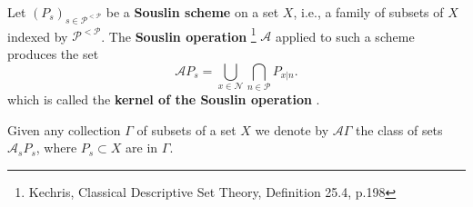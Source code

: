 \begin{definition}
Let $(P_s)_{s\in\mathcal{P}^{<\mathcal{P}}}$ be a \textbf{Souslin scheme}
on a set $X$, i.e., a family of subsets of $X$ indexed by
$\mathcal{P}^{<\mathcal{P}}$. The \textbf{Souslin operation}
\footnote{Kechris, Classical Descriptive Set Theory, Definition 25.4, p.198}
$\mathcal{A}$ applied to such a scheme produces the set
\[
  \mathcal{A} P_s 
    = \bigcup_{x\in\mathcal{N}} \bigcap_{n\in\mathcal{P}} P_{x|n}.
\]
which is called the \textbf{kernel of the Souslin operation}
.

Given any collection $\Gamma$ of subsets of a set $X$ we denote by
$\mathcal{A} \Gamma$ the class of sets $\mathcal{A}_s P_s$, where
$P_s \subset X$ are in $\Gamma$.
\end{definition}


